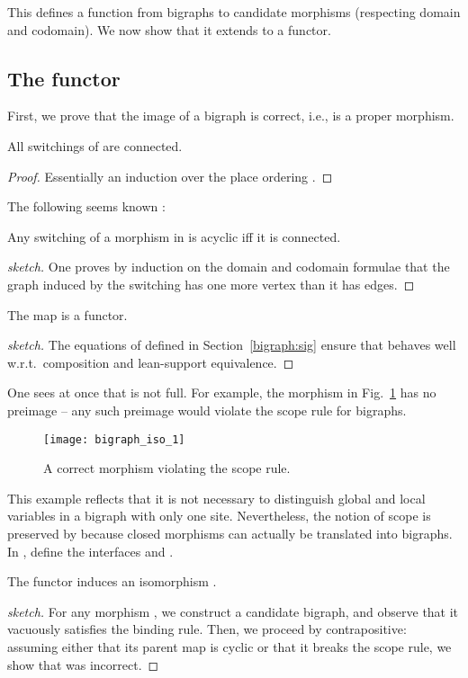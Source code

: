 \documentclass{llncs}
\begin{document}
This defines a function from bigraphs to candidate morphisms
(respecting domain and codomain).  We now show that it extends to a
functor.
\subsection{The functor}

First, we prove that the image of a bigraph is correct, i.e., is a
proper morphism.

\begin{lemma}\label{lemma:connected}
    All switchings of  are connected. 
\end{lemma}
\begin{proof}
  Essentially an induction over the place ordering .
\end{proof}
The following seems known \cite{Soloviev:imll}:
\begin{lemma}
  Any switching of a morphism in  is acyclic iff it
  is connected.
\end{lemma}
\begin{proof}[sketch]
    One proves by induction on the domain and codomain formulae that the
    graph induced by the switching has one more vertex than it has edges.
\end{proof}

\begin{lemma}
    The map  is a functor. 
\end{lemma}
\begin{proof}[sketch]
    The equations of  defined in Section~\ref{bigraph:sig}
    ensure that  behaves well w.r.t.\ composition and lean-support
    equivalence. 
\end{proof}


One sees at once that  is not full. For example, the morphism in
Fig.~\ref{bigraph:iso_1} has no preimage -- any such preimage would
violate the scope rule for bigraphs.
\begin{figure}[!ht] \centering
    \texttt{[image: bigraph\_iso\_1]}
    \caption{A correct morphism violating the scope rule.}
    \label{bigraph:iso_1}
\end{figure}
This example reflects that it is not necessary to distinguish global and local
variables in a bigraph with only one site. 
Nevertheless, the notion of scope is preserved by  because closed morphisms
can actually be translated into bigraphs.
In , define 
the interfaces 
and .
\begin{lemma}\label{lemma:closed}
  The functor  induces an isomorphism .
\end{lemma}
\begin{proof}[sketch]
  For any morphism , we construct a candidate bigraph,
  and observe that it vacuously satisfies the binding rule.  Then, we
  proceed by contrapositive: assuming either that its parent map is
  cyclic or that it breaks the scope rule, we show that  was
  incorrect.
\end{proof}
\end{document}
